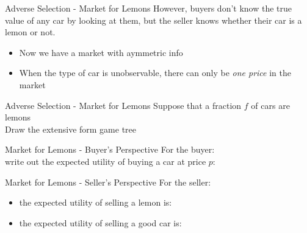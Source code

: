 
\begin{frame}{Adverse Selection - Market for Lemons}
  However, buyers don't know the true value of any car by looking at them,
  but the seller knows whether their car is a lemon or not.
  \begin{itemize}
    \item Now we have a market with \alert{aymmetric info}
    \item When the type of car is unobservable,
    there can only be \textit{one price} in the market
  \end{itemize}
\end{frame}


\begin{frame}{Adverse Selection - Market for Lemons}
   Suppose that a fraction $f$  of cars are lemons \\ 
   Draw the extensive form game tree
\end{frame}


\begin{frame}[plain]{}
  
\end{frame}


\begin{frame}{Market for Lemons - Buyer's Perspective}
  For the buyer: \\ 
  write out the expected utility of buying a car at price $p$:
\end{frame}


\begin{frame}{Market for Lemons - Seller's Perspective}
  For the seller: \\ 
  \begin{itemize}
    \item the expected utility of selling a lemon is:
    \vspace{15mm}
    \item the expected utility of selling a good car is:
  \end{itemize}
\end{frame}

